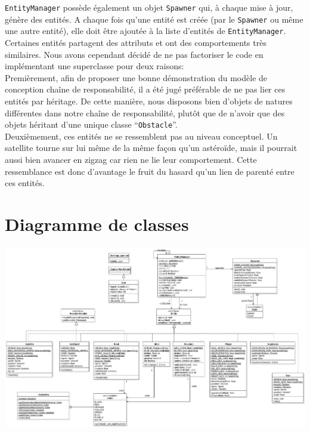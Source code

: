 \documentclass[11pt,a4paper,twoside,svgnames]{article}
\begin{document}
\texttt{EntityManager} possède également un objet \texttt{Spawner} qui, à chaque mise à jour, génère des entités. A chaque fois qu'une entité est créée (par le \texttt{Spawner} ou même une autre entité), elle doit être ajoutée à la liste d'entités de \texttt{EntityManager}.\\

Certaines entités partagent des attributs et ont des comportements très similaires. Nous avons cependant décidé de ne pas factoriser le code en implémentant une superclasse pour deux raisons:\\

Premièrement, afin de proposer une bonne démonstration du modèle de conception chaîne de responsabilité, il a été jugé préférable de ne pas lier ces entités par héritage. De cette manière, nous disposons bien d'objets de natures différentes dans notre chaîne de responsabilité, plutôt que de n'avoir que des objets héritant d'une unique classe ``\texttt{Obstacle}''.\\

Deuxièmement, ces entités ne se ressemblent pas au niveau conceptuel. Un satellite tourne sur lui même de la même façon qu'un astéroïde, mais il pourrait aussi bien avancer en zigzag car rien ne lie leur comportement. Cette ressemblance est donc d'avantage le fruit du hasard qu'un lien de parenté entre ces entités.

\section{Diagramme de classes}

\begin{center}
    \noindent
    \includegraphics[width=0.74\pageheight, height=\linewidth,keepaspectratio,angle=90,origin=c]{uml_cor.pdf}
\end{center}
\end{document}
